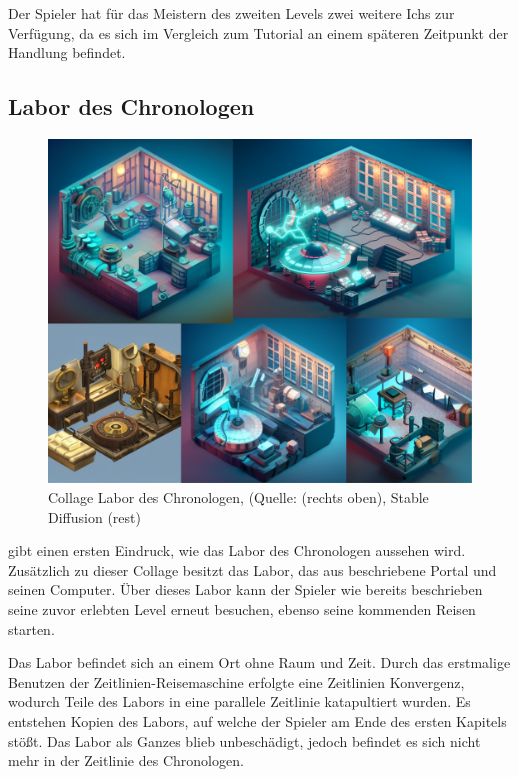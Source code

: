 Der Spieler hat für das Meistern des zweiten Levels zwei weitere Ichs zur Verfügung, da es sich im Vergleich zum Tutorial an einem späteren Zeitpunkt der Handlung befindet. 

\subsection{Labor des Chronologen}

\begin{figure}[ht]
\centering
\includegraphics[width=1\linewidth]{content/pictures/Collage Labor Chronologist.jpg}
\caption{Collage Labor des Chronologen, (Quelle: \cite{cg_plane_dribbble_nodate} (rechts oben), Stable Diffusion (rest)}
\label{fig:collage_labor_chron}
\end{figure}

 gibt einen ersten Eindruck, wie das Labor des Chronologen aussehen wird. Zusätzlich zu dieser Collage besitzt das Labor, das aus  beschriebene Portal und seinen Computer. Über dieses Labor kann der Spieler wie bereits beschrieben seine zuvor erlebten Level erneut besuchen, ebenso seine kommenden Reisen starten.

Das Labor befindet sich an einem Ort ohne Raum und Zeit. Durch das erstmalige Benutzen der Zeitlinien-Reisemaschine erfolgte eine Zeitlinien Konvergenz, wodurch Teile des Labors in eine parallele Zeitlinie katapultiert wurden. Es entstehen Kopien des Labors, auf welche der Spieler am Ende des ersten Kapitels stößt. Das Labor als Ganzes blieb unbeschädigt, jedoch befindet es sich nicht mehr in der Zeitlinie des Chronologen.

